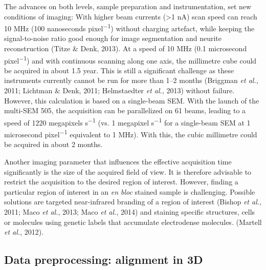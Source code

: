 \documentclass{article}
\begin{document}
The advances on both levels, sample preparation and instrumentation, set new conditions of imaging: With higher beam currents (>1 nA) scan speed can reach 10 MHz (100 nanoseconds pixel\textsuperscript{−1}) without charging artefact, while keeping the signal-to-noise ratio good enough for image segmentation and neurite reconstruction (Titze \& Denk, 2013). At a speed of 10 MHz (0.1 microsecond pixel\textsuperscript{−1}) and with continuous scanning along one axis, the millimetre cube could be acquired in about 1.5 year. This is still a significant challenge as these instruments currently cannot be run for more than 1–2 months (Briggman \emph{et al.}, 2011; Lichtman \& Denk, 2011; Helmstaedter \emph{et al.}, 2013) without failure. However, this calculation is based on a single-beam SEM. With the launch of the multi-SEM 505, the acquisition can be parallelized on 61 beams, leading to a speed of 1220 megapixels s\textsuperscript{−1} (vs. 1 megapixel s\textsuperscript{−1} for a single-beam SEM at 1 microsecond pixel\textsuperscript{−1} equivalent to 1 MHz). With this, the cubic millimetre could be acquired in about 2 months.

Another imaging parameter that influences the effective acquisition time significantly is the size of the acquired field of view. It is therefore advisable to restrict the acquisition to the desired region of interest. However, finding a particular region of interest in an \emph{en bloc} stained sample is challenging. Possible solutions are targeted near-infrared branding of a region of interest (Bishop \emph{et al.}, 2011; Maco \emph{et al.}, 2013; Maco \emph{et al.}, 2014) and staining specific structures, cells or molecules using genetic labels that accumulate electrodense molecules. (Martell \emph{et al.}, 2012).

\subsection*{Data preprocessing: alignment in 3D}
\end{document}
